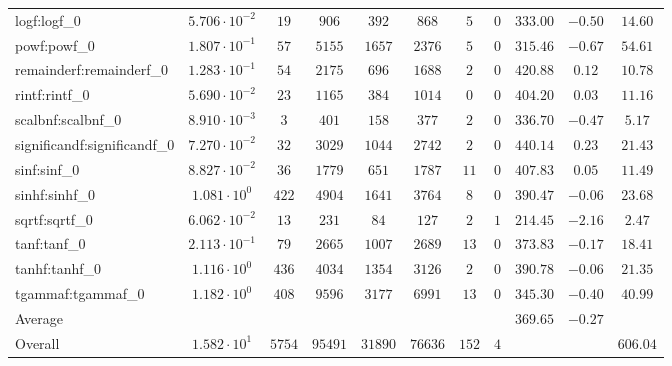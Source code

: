 \begin{tabular}{|l|c|c|c|c|c|c|c|c|c|c|}
logf:logf\_0                 & $ 5.706 \cdot 10^{-2} $ & $ 19     $ & $ 906   $ & $ 392   $ & $ 868   $ & $ 5   $ & $ 0 $ & $ 333.00      $ & $ -0.50   $ & $ 14.60   $ \\
powf:powf\_0                 & $ 1.807 \cdot 10^{-1} $ & $ 57     $ & $ 5155  $ & $ 1657  $ & $ 2376  $ & $ 5   $ & $ 0 $ & $ 315.46      $ & $ -0.67   $ & $ 54.61   $ \\
remainderf:remainderf\_0     & $ 1.283 \cdot 10^{-1} $ & $ 54     $ & $ 2175  $ & $ 696   $ & $ 1688  $ & $ 2   $ & $ 0 $ & $ 420.88      $ & $ 0.12    $ & $ 10.78   $ \\
rintf:rintf\_0               & $ 5.690 \cdot 10^{-2} $ & $ 23     $ & $ 1165  $ & $ 384   $ & $ 1014  $ & $ 0   $ & $ 0 $ & $ 404.20      $ & $ 0.03    $ & $ 11.16   $ \\
scalbnf:scalbnf\_0           & $ 8.910 \cdot 10^{-3} $ & $ 3      $ & $ 401   $ & $ 158   $ & $ 377   $ & $ 2   $ & $ 0 $ & $ 336.70      $ & $ -0.47   $ & $ 5.17    $ \\
significandf:significandf\_0 & $ 7.270 \cdot 10^{-2} $ & $ 32     $ & $ 3029  $ & $ 1044  $ & $ 2742  $ & $ 2   $ & $ 0 $ & $ 440.14      $ & $ 0.23    $ & $ 21.43   $ \\
sinf:sinf\_0                 & $ 8.827 \cdot 10^{-2} $ & $ 36     $ & $ 1779  $ & $ 651   $ & $ 1787  $ & $ 11  $ & $ 0 $ & $ 407.83      $ & $ 0.05    $ & $ 11.49   $ \\
sinhf:sinhf\_0               & $ 1.081 \cdot 10^{0}  $ & $ 422    $ & $ 4904  $ & $ 1641  $ & $ 3764  $ & $ 8   $ & $ 0 $ & $ 390.47      $ & $ -0.06   $ & $ 23.68   $ \\
sqrtf:sqrtf\_0               & $ 6.062 \cdot 10^{-2} $ & $ 13     $ & $ 231   $ & $ 84    $ & $ 127   $ & $ 2   $ & $ 1 $ & $ 214.45      $ & $ -2.16   $ & $ 2.47    $ \\
tanf:tanf\_0                 & $ 2.113 \cdot 10^{-1} $ & $ 79     $ & $ 2665  $ & $ 1007  $ & $ 2689  $ & $ 13  $ & $ 0 $ & $ 373.83      $ & $ -0.17   $ & $ 18.41   $ \\
tanhf:tanhf\_0               & $ 1.116 \cdot 10^{0}  $ & $ 436    $ & $ 4034  $ & $ 1354  $ & $ 3126  $ & $ 2   $ & $ 0 $ & $ 390.78      $ & $ -0.06   $ & $ 21.35   $ \\
tgammaf:tgammaf\_0           & $ 1.182 \cdot 10^{0}  $ & $ 408    $ & $ 9596  $ & $ 3177  $ & $ 6991  $ & $ 13  $ & $ 0 $ & $ 345.30      $ & $ -0.40   $ & $ 40.99   $ \\
\hline
Average                      & $                     $ & $        $ & $       $ & $       $ & $       $ & $     $ & $   $ & $ 369.65      $ & $ -0.27   $ & $         $ \\
\hline
Overall                      & $ 1.582 \cdot 10^{1}  $ & $ 5754   $ & $ 95491 $ & $ 31890 $ & $ 76636 $ & $ 152 $ & $ 4 $ & $             $ & $         $ & $ 606.04  $ \\
\hline
\end{tabular}
